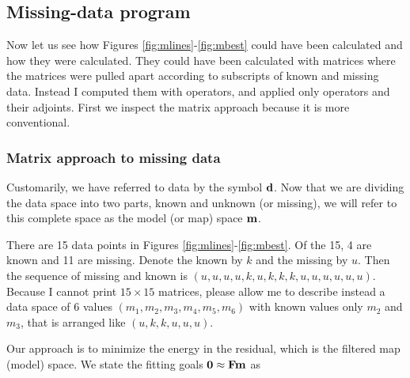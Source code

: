 \subsection{Missing-data program}
Now let us see how Figures \ref{fig:mlines}-\ref{fig:mbest}
could have been calculated and how they were calculated.
They could have been calculated with matrices
where the matrices were pulled apart according to subscripts of known and missing data.
Instead I computed them with operators,
and applied only operators and their adjoints.
First we inspect the matrix approach
because it is more conventional.

\subsubsection{Matrix approach to missing data}
\par
Customarily, we have referred to data by the symbol $\bold d$.
Now that we are dividing the data space into two parts,
known and unknown (or missing),
we will refer to this complete space
as the model (or map) space $\bold m$.
\par
There are 15 data points in Figures \ref{fig:mlines}-\ref{fig:mbest}.
Of the 15, 4 are known and 11 are missing.
Denote the known by $k$ and the missing by $u$.
Then the sequence of missing and known
is $(u,u,u,u,k,u,k,k,k,u,u,u,u,u,u)$.
Because I cannot print $15\times 15$ matrices,
please allow me to describe instead a data space of 6 values
$(m_1, m_2, m_3, m_4, m_5, m_6)$ with known values only $m_2$ and $m_3$,
that is arranged like $(u,k,k,u,u,u)$.
\par
Our approach is to minimize the energy in the residual,
which is the filtered map (model) space.
We state the fitting goals
$\bold 0\approx \bold F\bold m$ as
